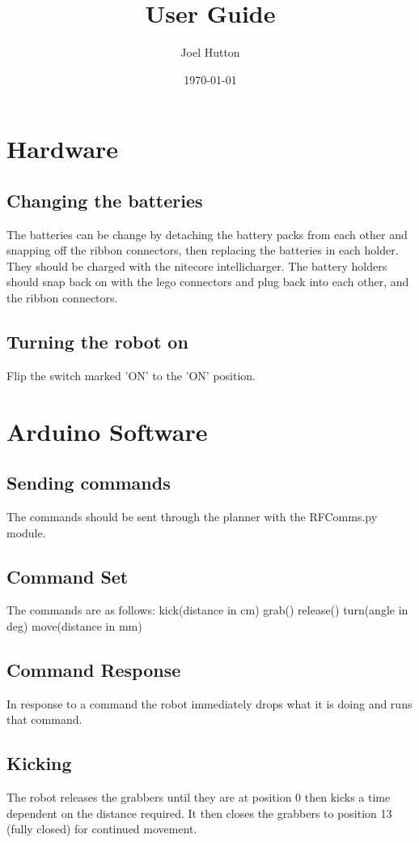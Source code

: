 \documentclass[a4paper]{article}
\title{User Guide}
\author{Joel Hutton}
\date{\today}
\begin{document}
\maketitle


\section{Hardware}
\subsection{Changing the batteries}
The batteries can be change by detaching the battery packs from each other and snapping off the ribbon connectors, then replacing the batteries in each holder. They should be charged with the nitecore intellicharger. The battery holders should snap back on with the lego connectors and plug back into each other, and the ribbon connectors.

\subsection{Turning the robot on}
Flip the switch marked 'ON' to the 'ON' position.

\section{Arduino Software}
\subsection{Sending commands}
The commands should be sent through the planner with the RFComms.py module. 

\subsection{Command Set}
The commands are as follows:
kick(distance in cm)
grab()
release()
turn(angle in deg)
move(distance in mm)
\subsection{Command Response}
In response to a command the robot immediately drops what it is doing and runs that command. 
\subsection{Kicking}
The robot releases the grabbers until they are at position 0 then kicks a time dependent on the distance required. It then closes the grabbers to position 13 (fully closed) for continued movement.
\end{document}
